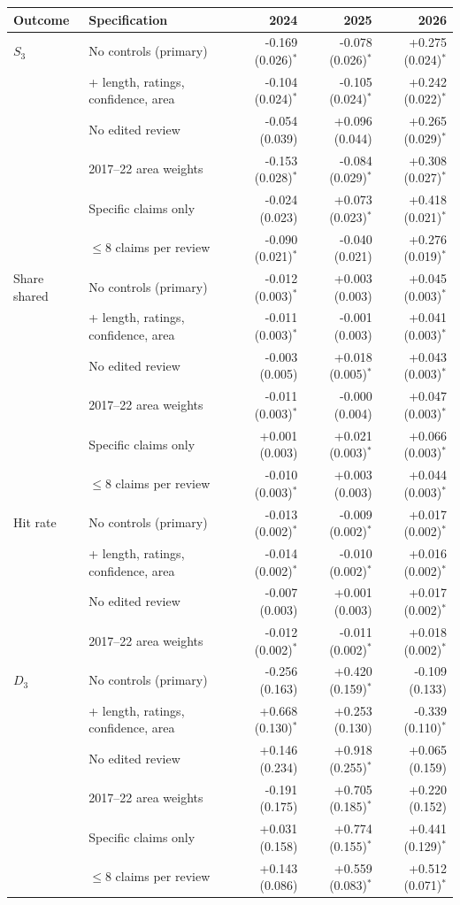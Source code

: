 \begin{tabular}{llrrr}
\toprule
Outcome & Specification & 2024 & 2025 & 2026 \\
\midrule
$S_3$ & No controls (primary) & -0.169 (0.026)$^{*}$ & -0.078 (0.026)$^{*}$ & +0.275 (0.024)$^{*}$ \\
 & + length, ratings, confidence, area & -0.104 (0.024)$^{*}$ & -0.105 (0.024)$^{*}$ & +0.242 (0.022)$^{*}$ \\
 & No edited review & -0.054 (0.039) & +0.096 (0.044) & +0.265 (0.029)$^{*}$ \\
 & 2017--22 area weights & -0.153 (0.028)$^{*}$ & -0.084 (0.029)$^{*}$ & +0.308 (0.027)$^{*}$ \\
 & Specific claims only & -0.024 (0.023) & +0.073 (0.023)$^{*}$ & +0.418 (0.021)$^{*}$ \\
 & $\le$8 claims per review & -0.090 (0.021)$^{*}$ & -0.040 (0.021) & +0.276 (0.019)$^{*}$ \\
\addlinespace
Share shared & No controls (primary) & -0.012 (0.003)$^{*}$ & +0.003 (0.003) & +0.045 (0.003)$^{*}$ \\
 & + length, ratings, confidence, area & -0.011 (0.003)$^{*}$ & -0.001 (0.003) & +0.041 (0.003)$^{*}$ \\
 & No edited review & -0.003 (0.005) & +0.018 (0.005)$^{*}$ & +0.043 (0.003)$^{*}$ \\
 & 2017--22 area weights & -0.011 (0.003)$^{*}$ & -0.000 (0.004) & +0.047 (0.003)$^{*}$ \\
 & Specific claims only & +0.001 (0.003) & +0.021 (0.003)$^{*}$ & +0.066 (0.003)$^{*}$ \\
 & $\le$8 claims per review & -0.010 (0.003)$^{*}$ & +0.003 (0.003) & +0.044 (0.003)$^{*}$ \\
\addlinespace
Hit rate & No controls (primary) & -0.013 (0.002)$^{*}$ & -0.009 (0.002)$^{*}$ & +0.017 (0.002)$^{*}$ \\
 & + length, ratings, confidence, area & -0.014 (0.002)$^{*}$ & -0.010 (0.002)$^{*}$ & +0.016 (0.002)$^{*}$ \\
 & No edited review & -0.007 (0.003) & +0.001 (0.003) & +0.017 (0.002)$^{*}$ \\
 & 2017--22 area weights & -0.012 (0.002)$^{*}$ & -0.011 (0.002)$^{*}$ & +0.018 (0.002)$^{*}$ \\
\addlinespace
$D_3$ & No controls (primary) & -0.256 (0.163) & +0.420 (0.159)$^{*}$ & -0.109 (0.133) \\
 & + length, ratings, confidence, area & +0.668 (0.130)$^{*}$ & +0.253 (0.130) & -0.339 (0.110)$^{*}$ \\
 & No edited review & +0.146 (0.234) & +0.918 (0.255)$^{*}$ & +0.065 (0.159) \\
 & 2017--22 area weights & -0.191 (0.175) & +0.705 (0.185)$^{*}$ & +0.220 (0.152) \\
 & Specific claims only & +0.031 (0.158) & +0.774 (0.155)$^{*}$ & +0.441 (0.129)$^{*}$ \\
 & $\le$8 claims per review & +0.143 (0.086) & +0.559 (0.083)$^{*}$ & +0.512 (0.071)$^{*}$ \\
\bottomrule
\end{tabular}

